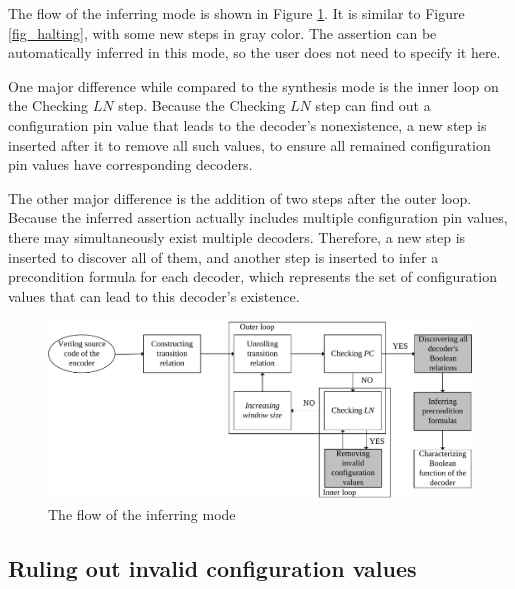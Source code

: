 \documentclass[runningheads,a4paper]{llncs}
\begin{document}
The flow of the inferring mode is shown in Figure \ref{fig_infer}.
It is similar to Figure \ref{fig_halting},
with some new steps in gray color.
The assertion can be automatically inferred in this mode,
so the user does not need to specify it here.

One major difference while compared to the synthesis mode is the inner loop on the Checking $LN$ step.
Because the Checking $LN$ step can find out a configuration pin value that leads to the decoder's nonexistence,
a new step is inserted after it to remove all such values,
to ensure all remained configuration pin values have corresponding decoders.

The other major difference is the addition of two steps after the outer loop.
Because the inferred assertion actually includes multiple configuration pin values,
there may simultaneously exist multiple decoders.
Therefore,
a new step is inserted to discover all of them,
and another step is inserted to infer a precondition formula for each decoder,
which represents the set of configuration values that can lead to this decoder's existence.

\begin{figure}[t]
\centering
\includegraphics[width=\textwidth]{infer}
\caption{The flow of the inferring mode}
\label{fig_infer}
\end{figure}


\subsection{Ruling out invalid configuration values}
\end{document}
